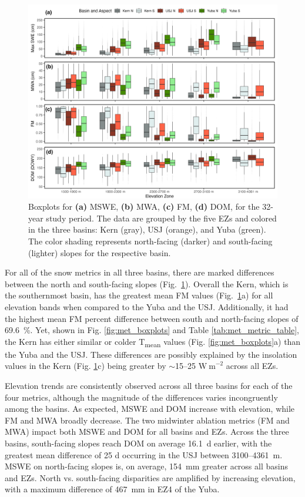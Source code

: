 \begin{figure}[t]
\includegraphics[width=\textwidth]{figures/ch2_figs/snow4_boxplot_v5.png}
\caption{Boxplots for \textbf{(a)} MSWE, \textbf{(b)} MWA, \textbf{(c)} FM, \textbf{(d)} DOM, for the 32-year study period. The data are grouped by the five EZs and colored in the three basins: Kern (gray), USJ (orange), and Yuba (green). The color shading represents north-facing (darker) and south-facing (lighter) slopes for the respective basin.}
\label{fig:snow_boxplots}
\end{figure}


For all of the snow metrics in all three basins, there are marked differences between the north and south-facing slopes (Fig.~\ref{fig:snow_boxplots}). Overall the Kern, which is the southernmost basin, has the greatest mean FM values (Fig.~\ref{fig:snow_boxplots}a) for all elevation bands when compared to the Yuba and the USJ. Additionally, it had the highest mean FM percent difference between south and north-facing slopes of 69.6~\%. Yet, shown in Fig. \ref{fig:met_boxplots} and Table \ref{tab:met_metric_table}, the Kern has either similar or colder T\textsubscript{mean} values (Fig. \ref{fig:met_boxplots}a) than the Yuba and the USJ. These differences are possibly explained by the insolation values in the Kern (Fig. \ref{fig:snow_boxplots}c) being greater by $\sim$15--25 $\mathrm{W~m}^{-2}$ across all EZs. 

Elevation trends are consistently observed across all three basins for each of the four metrics, although the magnitude of the differences varies incongruently among the basins. As expected, MSWE and DOM increase with elevation, while FM and MWA broadly decrease. The two midwinter ablation metrics (FM and MWA) impact both MSWE and DOM for all basins and EZs. Across the three basins, south-facing slopes reach DOM on average 16.1~d earlier, with the greatest mean difference of 25 d occurring in the USJ between 3100--4361~m. MSWE on north-facing slopes is, on average, 154~mm greater across all basins and EZs. North vs. south-facing disparities are amplified by increasing elevation, with a maximum difference of 467~mm in EZ4 of the Yuba.

